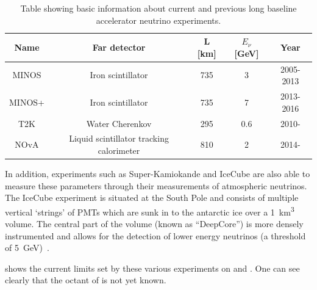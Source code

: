 \begin{table}
  \caption[Current and previous long-baseline accelerator neutrino experiments.]{Table showing basic information about current and previous long baseline accelerator neutrino experiments.}
  \label{tab:lblExp}
  \centering
  \begin{tabular}{c c c c c}
    \hline
    \hline
    Name & Far detector & L [\si{\kilo\metre}] & $E_{\nu}$ [\si{\giga\electronvolt}] & Year \\
    \hline
    MINOS  & Iron scintillator                  & 735 & 3   & 2005-2013 \\
    MINOS+ & Iron scintillator                  & 735 & 7   & 2013-2016 \\
    T2K    & Water Cherenkov                    & 295 & 0.6 & 2010- \\
    NOvA   & Liquid scintillator tracking calorimeter & 810 & 2   & 2014- \\
    \hline
  \end{tabular}
\end{table}

In addition, experiments such as Super-Kamiokande and IceCube are also able to measure these parameters through their measurements of atmospheric neutrinos.
The IceCube experiment is situated at the South Pole and consists of multiple vertical `strings' of PMTs which are sunk in to the antarctic ice over a \SI{1}{\km\cubed} volume.
The central part of the volume (known as ``DeepCore'') is more densely instrumented and allows for the detection of lower energy neutrinos (a threshold of \SI{5}{\giga\electronvolt})~\cite{icecube}.

 shows the current limits set by these various experiments on  and .
One can see clearly that the octant of  is not yet known.

